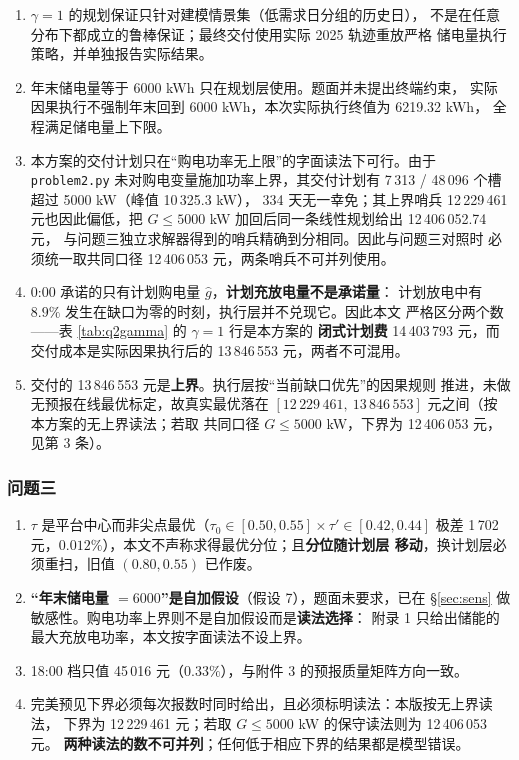 \documentclass[withoutpreface]{cumcmthesis}
\renewcommand{\emph}[1]{\textbf{#1}}
\begin{document}
\begin{enumerate}[itemsep=1pt, topsep=2pt]
  \item $\gamma=1$ 的规划保证只针对建模情景集（低需求日分组的历史日），
        不是在任意分布下都成立的鲁棒保证；最终交付使用实际 2025 轨迹重放严格
        储电量执行策略，并单独报告实际结果。
  \item 年末储电量等于 6000 kWh 只在规划层使用。题面并未提出终端约束，
        实际因果执行不强制年末回到 6000 kWh，本次实际执行终值为 6219.32 kWh，
        全程满足储电量上下限。
  \item 本方案的交付计划只在“购电功率无上限”的字面读法下可行。由于
        \texttt{problem2.py} 未对购电变量施加功率上界，其交付计划有
        7\,313 / 48\,096 个槽超过 5000 kW（峰值 10\,325.3 kW），
        334 天无一幸免；其上界哨兵 12\,229\,461 元也因此偏低，把
        $G\le5000$ kW 加回后同一条线性规划给出 12\,406\,052.74 元，
        与问题三独立求解器得到的哨兵精确到分相同。因此与问题三对照时
        必须统一取共同口径 12\,406\,053 元，两条哨兵不可并列使用。
  \item 0:00 承诺的只有计划购电量 $\hat g$，\emph{计划充放电量不是承诺量}：
        计划放电中有 $8.9\%$ 发生在缺口为零的时刻，执行层并不兑现它。因此本文
        严格区分两个数——表 \ref{tab:q2gamma} 的 $\gamma=1$ 行是本方案的
        \emph{闭式计划费} 14\,403\,793 元，而交付成本是实际因果执行后的
        13\,846\,553 元，两者不可混用。
  \item 交付的 13\,846\,553 元是\emph{上界}。执行层按“当前缺口优先”的因果规则
        推进，未做无预报在线最优标定，故真实最优落在
        $[12\,229\,461,\ 13\,846\,553]$ 元之间（按本方案的无上界读法；若取
        共同口径 $G\le5000$ kW，下界为 12\,406\,053 元，见第 3 条）。
\end{enumerate}

\subsubsection{问题三}
\label{sec:q3lim}

\begin{enumerate}[itemsep=1pt, topsep=2pt]
  \item $\tau$ 是平台中心而非尖点最优（$\tau_0\in[0.50,0.55]\times\tau'\in[0.42,0.44]$
        极差 1\,702 元，$0.012\%$），本文不声称求得最优分位；且\textbf{分位随计划层
        移动}，换计划层必须重扫，旧值 $(0.80,0.55)$ 已作废。
  \item \textbf{“年末储电量 $=6000$”是自加假设}（假设 7），题面未要求，已在
        \S\ref{sec:sens} 做敏感性。购电功率上界则不是自加假设而是\emph{读法选择}：
        附录 1 只给出储能的最大充放电功率，本文按字面读法不设上界。
  \item 18:00 档只值 45\,016 元（$0.33\%$），与附件 3 的预报质量矩阵方向一致。
  \item 完美预见下界必须每次报数时同时给出，且必须标明读法：本版按无上界读法，
        下界为 12\,229\,461 元；若取 $G\le5000$ kW 的保守读法则为 12\,406\,053 元。
        \textbf{两种读法的数不可并列}；任何低于相应下界的结果都是模型错误。
\end{enumerate}
\end{document}
